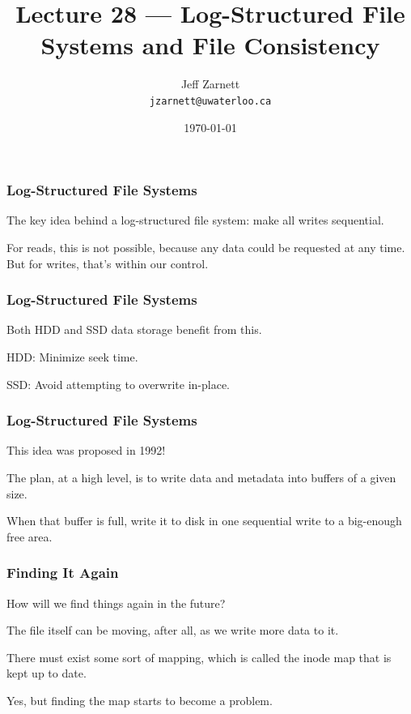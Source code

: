 

\title{Lecture 28 --- Log-Structured File Systems and File Consistency }

\author{Jeff Zarnett \\ \small \texttt{jzarnett@uwaterloo.ca}}
\date{\today}




\begin{frame}
  \titlepage

 \end{frame}


\begin{frame}
\frametitle{Log-Structured File Systems}

The key idea behind a log-structured file system: make all writes sequential.

 For reads, this is not possible, because any data could be requested at any time.\\
 \quad But for writes, that's within our control. 

\end{frame}


\begin{frame}
\frametitle{Log-Structured File Systems}

Both HDD and SSD data storage benefit from this. 

HDD: Minimize seek time.

SSD: Avoid attempting to overwrite in-place.

\end{frame}


\begin{frame}
\frametitle{Log-Structured File Systems}

This idea was proposed in 1992!

The plan, at a high level, is to write data and metadata into buffers of a given size.

When that buffer is full, write it to disk in one sequential write to a big-enough free area.


\end{frame}


\begin{frame}
\frametitle{Finding It Again}

How will we find things again in the future? 

The file itself can be moving, after all, as we write more data to it. 

There must exist some sort of mapping, which is called the \alert{inode map} that is kept up to date.

Yes, but finding the map starts to become a problem.

\end{frame}


